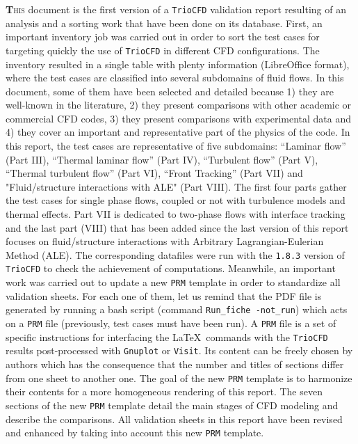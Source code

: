 \lettrine[lines=2,slope=0pt,nindent=4pt]{\textbf{T}}{his} document
is the first version of a \texttt{TrioCFD} validation report resulting
of an analysis and a sorting work that have been done on its database.
First, an important inventory job was carried out in order to sort
the test cases for targeting quickly the use of \texttt{TrioCFD}
in different CFD configurations. The inventory resulted in a single
table with plenty information (LibreOffice format), where the test
cases are classified into several subdomains of fluid flows. In this
document, some of them have been selected and detailed because 1)
they are well-known in the literature, 2) they present comparisons
with other academic or commercial CFD codes, 3) they present comparisons
with experimental data and 4) they cover an important and representative part of the
physics of the code. In this report, the test cases are representative
of five subdomains: ``Laminar flow'' (Part III), ``Thermal laminar
flow'' (Part IV), ``Turbulent flow'' (Part V), ``Thermal turbulent
flow'' (Part VI), ``Front Tracking'' (Part VII) and "Fluid/structure
interactions with ALE" (Part VIII). The first four
parts gather the test cases for single phase flows, coupled or not with
turbulence models and thermal effects. Part VII is dedicated
to two-phase flows with interface tracking and the last part (VIII) that
has been added since the last version of this report focuses on fluid/structure
interactions with Arbitrary Lagrangian-Eulerian Method (ALE). The corresponding datafiles
were run with the \texttt{1.8.3} version of \texttt{TrioCFD}
to check the achievement of computations. Meanwhile, an important
work was carried out to update a new \texttt{PRM} template in order
to standardize all validation sheets. For each one of them, let us
remind that the PDF file is generated by running a bash script (command
\texttt{Run\_fiche -not\_run}) which acts on a \texttt{PRM} file (previously, test cases must have
been run). A \texttt{PRM} file is a set of specific instructions for interfacing
the \LaTeX ~commands with the \texttt{TrioCFD} results post-processed
with \texttt{Gnuplot} or \texttt{Visit}. Its content can be freely
chosen by authors which has the consequence that the number and titles
of sections differ from one sheet to another one. The goal of the
new \texttt{PRM} template is to harmonize their contents for a more
homogeneous rendering of this report. The seven sections of the new
\texttt{PRM} template detail the main stages of CFD modeling and describe
the comparisons. All validation sheets in this report have been revised
and enhanced by taking into account this new \texttt{PRM} template.

